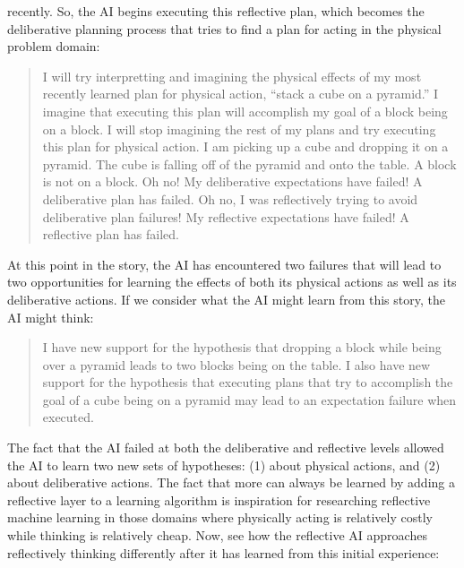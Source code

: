 recently.  So, the AI begins executing this reflective plan, which
becomes the deliberative planning process that tries to find a plan
for acting in the physical problem domain:
\begin{quote}
  I will try interpretting and imagining the physical effects of my
  most recently learned plan for physical action, ``stack a cube on a
  pyramid.''  I imagine that executing this plan will accomplish my
  goal of a block being on a block.  I will stop imagining the rest of
  my plans and try executing this plan for physical action.  I am
  picking up a cube and dropping it on a pyramid.  The cube is falling
  off of the pyramid and onto the table.  A block is not on a block.
  Oh no!  My deliberative expectations have failed!  A deliberative
  plan has failed.  Oh no, I was reflectively trying to avoid
  deliberative plan failures!  My reflective expectations have failed!
  A reflective plan has failed.
\end{quote}
At this point in the story, the AI has encountered two failures that
will lead to two opportunities for learning the effects of both its
physical actions as well as its deliberative actions.  If we consider
what the AI might learn from this story, the AI might think:
\begin{quote}
  I have new support for the hypothesis that dropping a block while
  being over a pyramid leads to two blocks being on the table.  I also
  have new support for the hypothesis that executing plans that try to
  accomplish the goal of a cube being on a pyramid may lead to an
  expectation failure when executed.
\end{quote}
The fact that the AI failed at both the deliberative and reflective
levels allowed the AI to learn two new sets of hypotheses: (1) about
physical actions, and (2) about deliberative actions.  The fact that
more can always be learned by adding a reflective layer to a learning
algorithm is inspiration for researching reflective machine learning
in those domains where physically acting is relatively costly while
thinking is relatively cheap.  Now, see how the reflective AI
approaches reflectively thinking differently after it has learned from
this initial experience:
